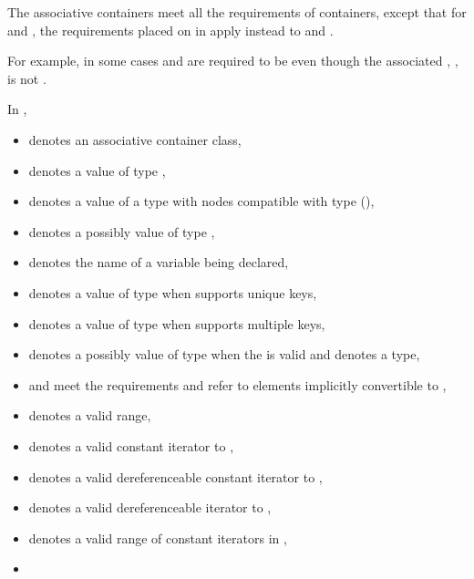 \pnum
The associative containers meet all the requirements of
 containers, except that for
 and , the requirements placed on 
in  apply instead to 
and .
\begin{note}
For example, in some cases  and 
are required to be  even though the associated
, , is not
.
\end{note}

\pnum
In ,
\begin{itemize}
\item
{} denotes an associative container class,
\item
{} denotes a value of type ,
\item
{} denotes a value of a type with nodes compatible with type
 (),
\item
{} denotes a possibly  value of type ,
\item
{} denotes the name of a variable being declared,
\item
{} denotes a value of type 
when  supports unique keys,
\item
{} denotes a value of type 
when  supports multiple keys,
\item
{} denotes a possibly  value of type 
when the 
 is valid
and denotes a type,
\item
{} and 
meet the  requirements and refer to elements
implicitly convertible to
,
\item
{} denotes a valid range,
\item
{} denotes a valid constant iterator to ,
\item
{} denotes a valid dereferenceable constant iterator to ,
\item
{} denotes a valid dereferenceable iterator to ,
\item
{} denotes a valid range of constant iterators in ,
\item

\end{itemize}
